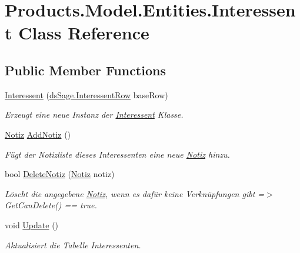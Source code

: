 \hypertarget{class_products_1_1_model_1_1_entities_1_1_interessent}{}\section{Products.\+Model.\+Entities.\+Interessent Class Reference}
\label{class_products_1_1_model_1_1_entities_1_1_interessent}
\subsection*{Public Member Functions}
\begin{DoxyCompactItemize}
\item 
\hyperlink{class_products_1_1_model_1_1_entities_1_1_interessent_ad372fb076abe00f574a3e27c89846b9e}{Interessent} (\hyperlink{class_products_1_1_data_1_1ds_sage_1_1_interessent_row}{ds\+Sage.\+Interessent\+Row} base\+Row)
\begin{DoxyCompactList}\small\item\em Erzeugt eine neue Instanz der \hyperlink{class_products_1_1_model_1_1_entities_1_1_interessent}{Interessent} Klasse. \end{DoxyCompactList}\item 
\hyperlink{class_products_1_1_model_1_1_entities_1_1_notiz}{Notiz} \hyperlink{class_products_1_1_model_1_1_entities_1_1_interessent_a92a7b6634f4dc8217075db3b0b23ed04}{Add\+Notiz} ()
\begin{DoxyCompactList}\small\item\em Fügt der Notizliste dieses Interessenten eine neue \hyperlink{class_products_1_1_model_1_1_entities_1_1_notiz}{Notiz} hinzu. \end{DoxyCompactList}\item 
bool \hyperlink{class_products_1_1_model_1_1_entities_1_1_interessent_a54377e56739fd798c85a1a44d94f7ec1}{Delete\+Notiz} (\hyperlink{class_products_1_1_model_1_1_entities_1_1_notiz}{Notiz} notiz)
\begin{DoxyCompactList}\small\item\em Löscht die angegebene \hyperlink{class_products_1_1_model_1_1_entities_1_1_notiz}{Notiz}, wenn es dafür keine Verknüpfungen gibt =$>$ Get\+Can\+Delete() == true. \end{DoxyCompactList}\item 
void \hyperlink{class_products_1_1_model_1_1_entities_1_1_interessent_aea6cf1e233c0859a296d430b624bfcf0}{Update} ()
\begin{DoxyCompactList}\small\item\em Aktualisiert die Tabelle Interessenten. \end{DoxyCompactList}\end{DoxyCompactItemize}
